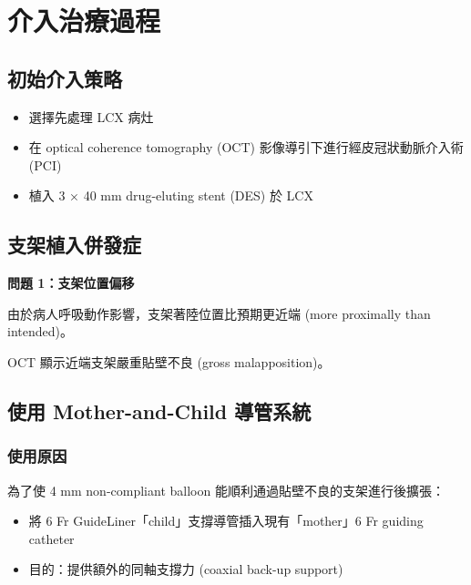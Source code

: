 \documentclass[12pt,a4paper]{article}
\begin{document}
\section{介入治療過程}

\subsection{初始介入策略}

\begin{itemize}
    \item 選擇先處理 LCX 病灶
    \item 在 optical coherence tomography (OCT) 影像導引下進行經皮冠狀動脈介入術 (PCI)
    \item 植入 3 × 40 mm drug-eluting stent (DES) 於 LCX
\end{itemize}

\subsection{支架植入併發症}

\begin{importantbox}
\textbf{問題 1：支架位置偏移}

由於病人呼吸動作影響，支架著陸位置比預期更近端 (more proximally than intended)。

OCT 顯示近端支架嚴重貼壁不良 (gross malapposition)。
\end{importantbox}

\subsection{使用 Mother-and-Child 導管系統}

\subsubsection{使用原因}

為了使 4 mm non-compliant balloon 能順利通過貼壁不良的支架進行後擴張：

\begin{itemize}
    \item 將 6 Fr GuideLiner「child」支撐導管插入現有「mother」6 Fr guiding catheter
    \item 目的：提供額外的同軸支撐力 (coaxial back-up support)
\end{itemize}
\end{document}
